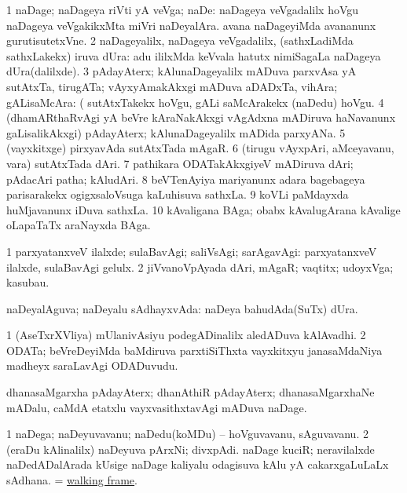 \bentry
{} 
\gl{\nA}
\expl{}
\bmng
\bnum
\num{1} naDage; naDageya riVti yA veVga; naDe:  naDageya veVgadalilx hoVgu  naDageya veVgakikxMta miVri naDeyalAra.  avana naDageyiMda avananunx gurutisutetxVne. 
\num{2} naDageyalilx, naDageya veVgadalilx, (sathxLadiMda sathxLakekx) iruva dUra:  adu ililxMda keVvala hatutx nimiSagaLa naDageya dUra(dalilxde). 
\num{3} pAdayAterx; kAlunaDageyalilx mADuva parxvAsa yA sutAtxTa, tirugATa; vAyxyAmakAkxgi mADuva aDADxTa, vihAra; gALisaMcAra:  (  sutAtxTakekx hoVgu, gALi saMcArakekx (naDedu) hoVgu. 
\num{4} (dhamARthaRvAgi yA beVre kAraNakAkxgi vAgAdxna mADiruva haNavanunx gaLisalikAkxgi) pAdayAterx; kAlunaDageyalilx mADida parxyANa. 
\num{5} (vayxkitxge) pirxyavAda sutAtxTada mAgaR. 
\num{6} (tirugu vAyxpAri, aMceyavanu, \mo vara) sutAtxTada dAri. 
\num{7} pathikara ODATakAkxgiyeV mADiruva dAri; pAdacAri patha; kAludAri. 
\num{8} beVTenAyiya mariyanunx adara bagebageya parisarakekx ogigxsaloVsuga kaLuhisuva sathxLa. 
\num{9} koVLi paMdayxda huMjavanunx iDuva sathxLa. 
\num{10} kAvaligana BAga; obabx kAvalugArana kAvalige oLapaTaTx araNayxda BAga. 
\enum
\emng

\noindent 
\gl{\pagu}
\expl{}
\bmng
\bnum
\num{1}  parxyatanxveV ilalxde; sulaBavAgi; saliVsAgi; sarAgavAgi:  parxyatanxveV ilalxde, sulaBavAgi gelulx. 
\num{2}  jiVvanoVpAyada dAri, mAgaR; vaqtitx; udoyxVga; kasubau. 
\enum
\emng
\eentry

\bentry 
{} 
\gl{\gu}
\expl{}
\bmng
naDeyalAguva; naDeyalu sAdhayxvAda:  naDeya bahudAda(SuTx) dUra. 
\emng
\eentry

\bentry
{} 
\gl{\nA}
\expl{}
\bmng
\bnum
\num{1} (AseTxrXVliya) mUlanivAsiyu podegADinalilx aledADuva kAlAvadhi. 
\num{2} ODATa; beVreDeyiMda baMdiruva parxtiSiThxta vayxkitxyu janasaMdaNiya madheyx saraLavAgi ODADuvudu. 
\enum
\emng
\eentry

\bentry
{} 
\gl{\nA}
\expl{}
\bmng
dhanasaMgarxha pAdayAterx; dhanAthiR pAdayAterx; dhanasaMgarxhaNe mADalu, caMdA etatxlu vayxvasithxtavAgi mADuva naDage. 
\emng
\eentry

\bentry
{} 
\gl{\nA}
\bmng
\bnum
\num{1} naDega; naDeyuvavanu; naDedu(koMDu) -- hoVguvavanu, sAguvavanu. 
\num{2} (eraDu kAlinalilx) naDeyuva pArxNi; divxpAdi. 
\banum
{} naDage kuciR; neravilalxde naDedADalArada kUsige naDage kaliyalu odagisuva kAlu yA cakarxgaLuLaLx sAdhana. 
 = \hyperlink{walking frame}{walking frame}. 
\eanum
\numie
\enum
\emng
\eentry


